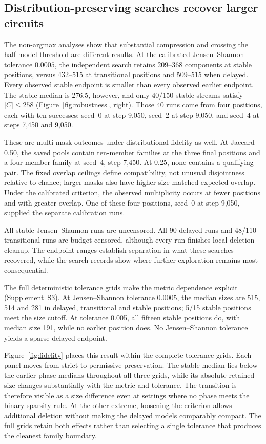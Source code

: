 \subsection{Distribution-preserving searches recover larger circuits}
\label{sec:nonargmax}

The non-argmax analyses show that substantial compression and crossing the half-model threshold are different results. At the calibrated Jensen--Shannon tolerance $0.0005$, the independent search retains 209--368 components at stable positions, versus 432--515 at transitional positions and 509--515 when delayed. Every observed stable endpoint is smaller than every observed earlier endpoint. The stable median is 276.5, however, and only 40/150 stable streams satisfy $|C|\leq258$ (Figure~\ref{fig:robustness}, right). Those 40 runs come from four positions, each with ten successes: seed~0 at step 9,050, seed~2 at step 9,050, and seed~4 at steps 7,450 and 9,050.

These are multi-mask outcomes under distributional fidelity as well. At Jaccard 0.50, the saved pools contain ten-member families at the three final positions and a four-member family at seed~4, step 7,450. At 0.25, none contains a qualifying pair. The fixed overlap ceilings define compatibility, not unusual disjointness relative to chance; larger masks also have higher size-matched expected overlap. Under the calibrated criterion, the observed multiplicity occurs at fewer positions and with greater overlap. One of these four positions, seed~0 at step 9,050, supplied the separate calibration runs.

All stable Jensen--Shannon runs are uncensored. All 90 delayed runs and 48/110 transitional runs are budget-censored, although every run finishes local deletion cleanup. The endpoint ranges establish separation in what these searches recovered, while the search records show where further exploration remains most consequential.

The full deterministic tolerance grids make the metric dependence explicit (Supplement~S3). At Jensen--Shannon tolerance 0.0005, the median sizes are 515, 514 and 281 in delayed, transitional and stable positions; 5/15 stable positions meet the size cutoff. At tolerance 0.005, all fifteen stable positions do, with median size 191, while no earlier position does. No Jensen--Shannon tolerance yields a sparse delayed endpoint.

Figure~\ref{fig:fidelity} places this result within the complete tolerance grids. Each panel moves from strict to permissive preservation. The stable median lies below the earlier-phase medians throughout all three grids, while its absolute retained size changes substantially with the metric and tolerance. The transition is therefore visible as a size difference even at settings where no phase meets the binary sparsity rule. At the other extreme, loosening the criterion allows additional deletion without making the delayed models comparably compact. The full grids retain both effects rather than selecting a single tolerance that produces the cleanest family boundary.

